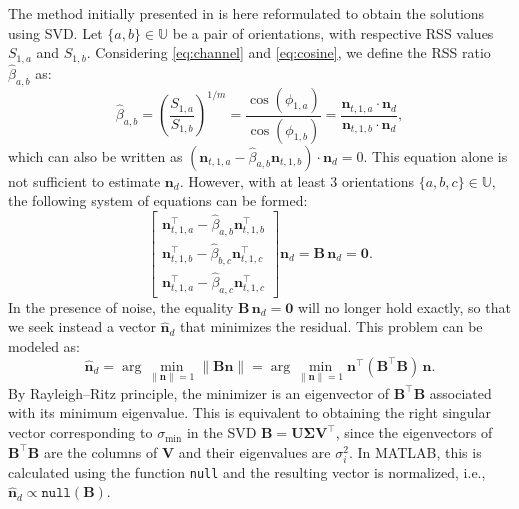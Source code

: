 \documentclass[conference]{IEEEtran}
\begin{document}
The method initially presented in \cite{Chassagne2025} is here reformulated to obtain the solutions using SVD. Let $\{a,b\}\in \mathbb{U}$ be a pair of orientations, with respective RSS values $S_{1,a}$ and $S_{1,b}$. Considering \eqref{eq:channel} and \eqref{eq:cosine}, we define the RSS ratio $\hat\beta_{a,b}$ as:
\begin{equation}
    \hat\beta_{a,b}=\left(\frac{S_{1,a}}{S_{1,b}}\right)^{1/m}
               =\frac{\cos{(\phi_{1,a})}}{\cos{(\phi_{1,b})}}
               =\frac{ \mathbf{n}_{t,1,a} \cdot \mathbf{n}_d }{ \mathbf{n}_{t,1,b} \cdot \mathbf{n}_d },
\label{eq:beta_def}               
\end{equation}
which can also be written as $(\mathbf{n}_{t,1,a} - \hat\beta_{a,b} \mathbf{n}_{t,1,b}) \cdot \mathbf{n}_d = 0$. This equation alone is not sufficient to estimate $\mathbf{n}_d$. However, with at least 3 orientations $\{a, b, c\} \in \mathbb{U}$, the following system of equations can be formed:
\begin{equation}
    \begin{bmatrix}
        \mathbf{n}_{t,1,a}^{\top} - \hat \beta_{a,b} \mathbf{n}_{t,1,b}^{\top} \\
        \mathbf{n}_{t,1,b}^{\top} - \hat \beta_{b,c} \mathbf{n}_{t,1,c}^{\top} \\ 
        \mathbf{n}_{t,1,a}^{\top} - \hat \beta_{a,c} \mathbf{n}_{t,1,c}^{\top}
    \end{bmatrix}
    \mathbf{n}_d=
    \mathbf{B} \, \mathbf{n}_d= \mathbf{0}.
\end{equation}
In the presence of noise, the equality $\mathbf{B} \, \mathbf{n}_d=\mathbf{0}$ will no longer hold exactly, so that we seek instead a vector $\hat{\mathbf{n}}_d$ that minimizes the residual. This problem can be modeled as:
\begin{equation}
    \hat{\mathbf{n}}_d = \arg \min_{\| \mathbf{n} \|=1} \| \mathbf{B} \mathbf{n} \|
        = \arg\min_{\|\mathbf{n}\|=1} \mathbf{n}^\top(\mathbf{B}^\top\mathbf{B})\,\mathbf{n}.
\end{equation}
By Rayleigh–Ritz principle, the minimizer is an eigenvector of $\mathbf{B}^\top\mathbf{B}$ associated with its minimum eigenvalue. This is equivalent to obtaining the right singular vector corresponding to $\sigma_{\min}$ in the SVD $\mathbf{B}=\mathbf{U}\boldsymbol{\Sigma}\mathbf{V}^\top$, since the eigenvectors of $\mathbf{B}^\top\mathbf{B}$ are the columns of $\mathbf{V}$ and their eigenvalues are $\sigma_i^2$. In MATLAB, this is calculated using the function \texttt{null} and the resulting vector is normalized, i.e., $\hat{\mathbf{n}}_d \propto \texttt{null}(\mathbf{B})$.
\end{document}
